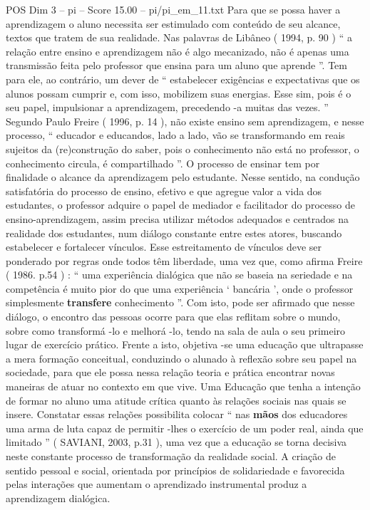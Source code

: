 \begin{textsample}{POS Dim 3 – pi – Score 15.00 – pi/pi\_em\_11.txt}
Para que se possa haver a aprendizagem o aluno necessita ser estimulado com conteúdo de seu alcance, textos que tratem de sua realidade.
Nas palavras de Libâneo ( 1994, p. 90 ) “ a relação entre ensino e aprendizagem não é algo mecanizado, não é apenas uma transmissão feita pelo professor que ensina para um aluno que aprende ”.
Tem para ele, ao contrário, um dever de “ estabelecer exigências e expectativas que os alunos possam cumprir e, com isso, mobilizem suas energias.
Esse sim, pois é o seu papel, impulsionar a aprendizagem, precedendo -a muitas das vezes. ” Segundo Paulo Freire ( 1996, p. 14 ), não existe ensino sem aprendizagem, e nesse processo, “ educador e educandos, lado a lado, vão se transformando em reais sujeitos da (re)construção do saber, pois o conhecimento não está no professor, o conhecimento circula, é compartilhado ”.
O processo de ensinar tem por finalidade o alcance da aprendizagem pelo estudante.
Nesse sentido, na condução satisfatória do processo de ensino, efetivo e que agregue valor a vida dos estudantes, o professor adquire o papel de mediador e facilitador do processo de ensino-aprendizagem, assim precisa utilizar métodos adequados e centrados na realidade dos estudantes, num diálogo constante entre estes atores, buscando estabelecer e fortalecer vínculos.
Esse estreitamento de vínculos deve ser ponderado por regras onde todos têm liberdade, uma vez que, como afirma Freire ( 1986. p.54 ) : “ uma experiência dialógica que não se baseia na seriedade e na competência é muito pior do que uma experiência ‘ bancária ’, onde o professor simplesmente \textbf{transfere} conhecimento ”.
Com isto, pode ser afirmado que nesse diálogo, o encontro das pessoas ocorre para que elas reflitam sobre o mundo, sobre como transformá -lo e melhorá -lo, tendo na sala de aula o seu primeiro lugar de exercício prático.
Frente a isto, objetiva -se uma educação que ultrapasse a mera formação conceitual, conduzindo o alunado à reflexão sobre seu papel na sociedade, para que ele possa nessa relação teoria e prática encontrar novas maneiras de atuar no contexto em que vive.
Uma Educação que tenha a intenção de formar no aluno uma atitude crítica quanto às relações sociais nas quais se insere.
Constatar essas relações possibilita colocar “ nas \textbf{mãos} dos educadores uma arma de luta capaz de permitir -lhes o exercício de um poder real, ainda que limitado ” ( SAVIANI, 2003, p.31 ), uma vez que a educação se torna decisiva neste constante processo de transformação da realidade social.
A criação de sentido pessoal e social, orientada por princípios de solidariedade e favorecida pelas interações que aumentam o aprendizado instrumental produz a aprendizagem dialógica.

\end{textsample}
